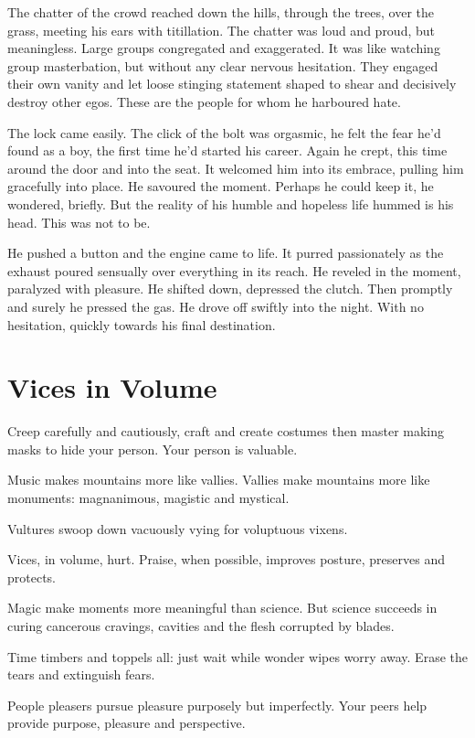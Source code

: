 \documentclass[fontsize=12pt,english]{article}
\begin{document}
The chatter of the crowd reached down the hills, through the trees,
over the grass, meeting his ears with titillation. The chatter was
loud and proud, but meaningless. Large groups congregated and
exaggerated. It was like watching group masterbation, but without any
clear nervous hesitation. They engaged their own vanity and let loose
stinging statement shaped to shear and decisively destroy other
egos. These are the people for whom he harboured hate.

The lock came easily. The click of the bolt was orgasmic, he felt the
fear he'd found as a boy, the first time he'd started his
career. Again he crept, this time around the door and into the
seat. It welcomed him into its embrace, pulling him gracefully into
place. He savoured the moment. Perhaps he could keep it, he wondered,
briefly. But the reality of his humble and hopeless life hummed is his
head. This was not to be.

He pushed a button and the engine came to life. It purred passionately
as the exhaust poured sensually over everything in its reach. He
reveled in the moment, paralyzed with pleasure. He shifted down,
depressed the clutch. Then promptly and surely he pressed the gas. He
drove off swiftly into the night. With no hesitation, quickly towards
his final destination.

\newpage

\section{Vices in Volume}


Creep carefully and cautiously, craft and create costumes then master
making masks to hide your person. Your person is valuable.



Music makes mountains more like vallies. Vallies make mountains more
like monuments: magnanimous, magistic and mystical.

Vultures swoop down vacuously vying for voluptuous vixens.

Vices, in volume, hurt. Praise, when possible, improves posture,
preserves and protects.

Magic make moments more meaningful than science. But science succeeds
in curing cancerous cravings, cavities and the flesh corrupted by
blades.

Time timbers and toppels all: just wait while wonder wipes worry
away. Erase the tears and extinguish fears.

People pleasers pursue pleasure purposely but imperfectly. Your peers
help provide purpose, pleasure and perspective.

\newpage
\end{document}
